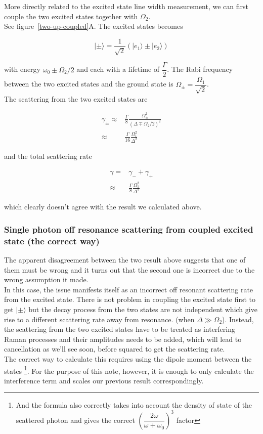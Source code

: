 \documentclass[10pt,fleqn]{article}
\newcommand{\eqar}[1]
{
  \begin{align*}
    #1
  \end{align*}
}
\newcommand{\paren}[1]{{\left({#1}\right)}}
\begin{document}
More directly related to the excited state line width measurement, we can first couple the
two excited states together with $\Omega_2$.\\

See \mbox{figure \ref{two-up-coupled}A}. The excited states becomes

\[|\pm\rangle=\frac{1}{\sqrt2}\paren{|e_1\rangle\pm|e_2\rangle}\]

with energy $\omega_0\pm\Omega_2/2$ and each with a lifetime of $\dfrac\Gamma2$.
The Rabi frequency between the two excited states and the ground state is
$\Omega_\pm=\dfrac{\Omega_1}{\sqrt2}$.\\
The scattering from the two excited states are
\eqar{
  \gamma_\pm\approx&\frac{\Gamma}{8}\frac{\Omega_\pm^2}{\paren{\Delta\mp\Omega_2/2}^2}\\
  \approx&\frac{\Gamma}{16}\frac{\Omega_1^2}{\Delta^2}
}
and the total scattering rate
\eqar{
  \gamma=&\gamma_-+\gamma_+\\
  \approx&\frac{\Gamma}{8}\frac{\Omega_1^2}{\Delta^2}
}
which clearly doesn't agree with the result we calculated above.

\subsubsection{Single photon off resonance scattering from coupled excited state
  (the correct way)}

The apparent disagreement between the two result above suggests that one of them must be wrong
and it turns out that the second one is incorrect due to the wrong assumption it made.\\

In this case, the issue manifests itself as an incorrect off resonant scattering rate
from the excited state. There is not problem in coupling the excited state first to get
$|\pm\rangle$ but the decay process from the two states are not independent which give rise
to a different scattering rate away from resonance. (when $\Delta\gg\Omega_2$).
Instead, the scattering from the two excited states have to be treated as interfering
Raman processes and their amplitudes needs to be added, which will lead to cancellation
as we'll see soon, before squared to get the scattering rate.\\

The correct way to calculate this requires using the dipole moment between the states
\footnote{And the formula also correctly takes into account the density of state of
  the scattered photon and gives the correct
  $\paren{\dfrac{2\omega}{\omega+\omega_0}}^3$ factor}.
For the purpose of this note, however, it is enough to only calculate the interference term
and scales our previous result correspondingly.\\
\end{document}
